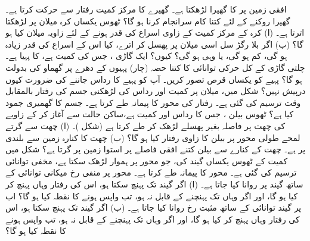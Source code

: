 افقی  زمین پر   کا گھیرا لڑھکتا ہے۔ گھیرے کا مرکز کمیت  رفتار سے حرکت کرتا ہے۔ گھیرا روکنے کے لئے کتنا کام  سرانجام کرنا  ہو گا؟
ٹھوس یکساں کرہ میلان پر لڑھکتا اترتا ہے۔ (ا) کرہ کے مرکز کمیت  کے زاوی اسراع کی قدر   ہونے کے لئے زاویہ  میلان  کیا ہو گا؟ (ب)  اگر بلا رگڑ سل اسی میلان پر پھسل کر اترے، کیا اس کے اسراع کی قدر زیادہ ہو گی، کم ہو گی، یا وہی ہو گی؟ کیوں؟
ایک گاڑی ، جس کی کمیت  ہے، کا پہیا  ہے۔ چلتی  گاڑی کے کل حرکی توانائی کا کتنا حصہ (چار)  پہیوں  کے  دھرے پر گھماو کی  بدولت ہو گا؟ پہیے  کو یکساں قرص تصور کریں۔ آپ کو پہیے کا رداس جاننے کی ضرورت کیوں درپیش نہیں؟
شکل  میں،   میلان پر   کمیت   اور   رداس کی    لڑھکنی  جسم کی  رفتار  بالمقابل وقت  ترسیم کی گئی  ہے۔ رفتار کی محور کا پیمانہ      طے کرتا   ہے۔ جسم کا گھمیری جمود کیا ہے؟
ٹھوس بیلن ، جس کا رداس  اور کمیت  ہے،ساکن حالت سے   آغاز کر کے     زاویے کی   چھت پر  فاصلہ  بغیر پھسلے   لڑھک کر طے کرتا ہے (شکل )۔ (ا)  چھت سے گرتے  لمحے  طولی  محور پر  بیلن کا زاوی رفتار کیا ہو گا؟ (ب)  چھت کا کنارہ زمین سے  بلندی  پر ہے۔ چھت کے کنارے سے بیلن کتنے افقی فاصلے پر  استوا  زمین  پر گرتا ہے؟
شکل  میں  کمیت کے   ٹھوس یکساں  گیند کی، جو محور  پر  ہموار لڑھک سکتا ہے،   مخفی توانائی    ترسیم کی گئی ہے۔ محور  کا پیمانہ      طے کرتا ہے۔ محور  پر منفی رخ  میکانی توانائی کے ساتھ گیند  پر  روانا کیا جاتا ہے۔ (ا)  اگر گیند  تک پہنچ سکتا ہو، اس کی رفتار وہاں پہنچ کر کیا ہو گا، اور اگر وہاں تک پہنچنے کے قابل نہ ہو، تب  واپس ہونے کا نقطہ کیا ہو گا؟  اب  پر گیند  توانائی کے ساتھ مثبت رخ روانا کیا جاتا ہے۔  (ب)  اگر گیند  تک پہنچ سکتا ہو، اس کی رفتار وہاں پہنچ کر کیا ہو گا، اور اگر وہاں تک پہنچنے کے قابل نہ ہو، تب  واپس ہونے کا نقطہ کیا ہو گا؟
